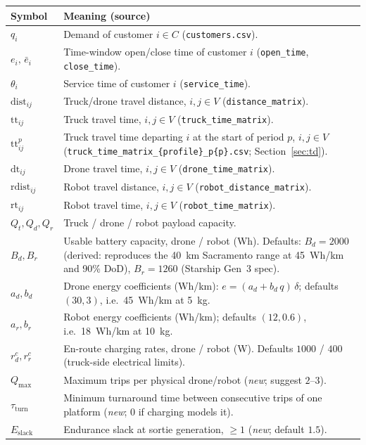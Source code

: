 \documentclass[10pt]{article}
\begin{document}
{\small
\begin{longtable}{@{}p{}p{}@{}}
\toprule
Symbol & Meaning (source) \\
\midrule
$q_i$ & Demand of customer $i\in C$ (\texttt{customers.csv}). \\
$e_i,\, \bar{e}_i$ & Time-window open/close time of customer $i$ (\texttt{open\_time}, \texttt{close\_time}). \\
$\theta_i$ & Service time of customer $i$ (\texttt{service\_time}). \\
$\mathrm{dist}_{ij}$ & Truck/drone travel distance, $i,j\in V$ (\texttt{distance\_matrix}). \\
$\mathrm{tt}_{ij}$ & Truck travel time, $i,j\in V$ (\texttt{truck\_time\_matrix}). \\
$\mathrm{tt}^p_{ij}$ & Truck travel time departing $i$ at the start of period $p$,
$i,j\in V$ (\texttt{truck\_time\_matrix\_\{profile\}\_p\{p\}.csv}; Section~\ref{sec:td}). \\
$\mathrm{dt}_{ij}$ & Drone travel time, $i,j\in V$ (\texttt{drone\_time\_matrix}). \\
$\mathrm{rdist}_{ij}$ & Robot travel distance, $i,j\in V$ (\texttt{robot\_distance\_matrix}). \\
$\mathrm{rt}_{ij}$ & Robot travel time, $i,j\in V$ (\texttt{robot\_time\_matrix}). \\
$Q_t, Q_d, Q_r$ & Truck / drone / robot payload capacity. \\
$B_d, B_r$ & Usable battery capacity, drone / robot (Wh). Defaults: $B_d = 2000$ (derived: reproduces the 40~km Sacramento range at 45~Wh/km and 90\% DoD), $B_r = 1260$ (Starship Gen~3 spec). \\
$a_d, b_d$ & Drone energy coefficients (Wh/km): $e = (a_d + b_d\,q)\,\delta$; defaults $(30, 3)$, i.e.\ 45~Wh/km at 5~kg. \\
$a_r, b_r$ & Robot energy coefficients (Wh/km); defaults $(12, 0.6)$, i.e.\ 18~Wh/km at 10~kg. \\
$r^c_d, r^c_r$ & En-route charging rates, drone / robot (W). Defaults $1000$ / $400$ (truck-side electrical limits). \\
$Q_{\max}$ & Maximum trips per physical drone/robot (\emph{new}; suggest $2$--$3$). \\
$\tau_{\mathrm{turn}}$ & Minimum turnaround time between consecutive trips of one platform (\emph{new}; $0$ if charging models it). \\
$E_{\mathrm{slack}}$ & Endurance slack at sortie generation, $\ge 1$ (\emph{new}; default $1.5$). \\

\end{longtable}}
\end{document}
